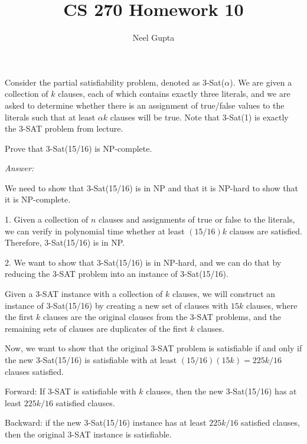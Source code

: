 \documentclass[12pt]{article}
\newenvironment{problem}[2][Problem]{\begin{trivlist}
\item[\hskip \labelsep {\bfseries #1}\hskip \labelsep {\bfseries #2.}]}{\end{trivlist}}
\begin{document}

\title{\vspace{-4cm}CS 270 Homework 10}
\author{Neel Gupta} 
\maketitle

\begin{problem}{1}
    Consider the partial satisfiability problem, denoted as 3-Sat($\alpha$). We are given a collection of $k$ clauses, each of which contains exactly three literals, and we are asked to determine whether there is an assignment of true/false values to the literals such that at least $\alpha k$ clauses will be true. Note that 3-Sat(1) is exactly the 3-SAT problem from lecture.

    Prove that 3-Sat(15/16) is NP-complete.
\end{problem}

\textit{Answer:}

We need to show that 3-Sat(15/16) is in NP and that it is NP-hard to show that it is NP-complete.

1. Given a collection of $n$ clauses and assignments of true or false to the literals, we can verify in polynomial time whether at least $(15/16)k$ clauses are satisfied. Therefore, 3-Sat(15/16) is in NP.

2. We want to show that 3-Sat(15/16) is in NP-hard, and we can do that by reducing the 3-SAT problem into an instance of 3-Sat(15/16).

Given a 3-SAT instance with a collection of $k$ clauses, we will construct an instance of 3-Sat(15/16) by creating a new set of clauses with $15k$ clauses, where the first $k$ clauses are the original clauses from the 3-SAT problems, and the remaining sets of clauses are duplicates of the first $k$ clauses.

Now, we want to show that the original 3-SAT problem is satisfiable if and only if the new 3-Sat(15/16) is satisfiable with at least $(15/16)(15k) = 225k/16$ clauses satisfied.

Forward: If 3-SAT is satisfiable with $k$ clauses, then the new 3-Sat(15/16) has at least $225k/16$  satisfied clauses.

Backward: if the new 3-Sat(15/16) instance has at least $225k/16$ satisfied clauses, then the original 3-SAT instance is satisfiable.
\end{document}

